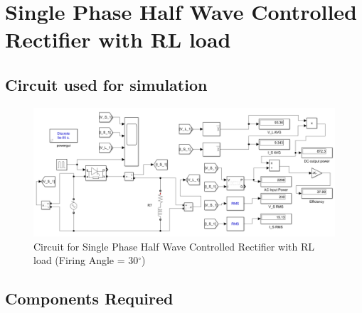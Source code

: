 \section{Single Phase Half Wave Controlled Rectifier with RL load}

\subsection{Circuit used for simulation}

\begin{figure}[h]
    \centering
    \includegraphics[width=1.0\textwidth]{images/experiment-1/circuit-diagram-experiment-06.png}
    \caption{Circuit for Single Phase Half Wave Controlled Rectifier with RL load  (Firing Angle = 30$ ^\circ $)}
    \label{Fig_simulation_circuit_single-phase-half-wave-controlled-rectifier-with-RL-load}
\end{figure}

\subsection{Components Required}


